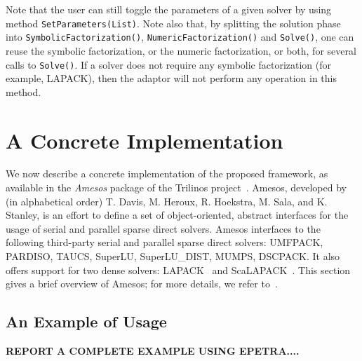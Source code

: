\documentclass[acmtocl]{acmtrans2m}
\begin{document}
Note that the user can still toggle the parameters of a given solver by using
method \verb!SetParameters(List)!. Note also that, by splitting the solution phase
into \verb!SymbolicFactorization()!, \verb!NumericFactorization()! and
\verb!Solve()!, one can reuse the symbolic factorization, or the numeric
factorization, or both, for several calls to \verb!Solve()!. If a solver does
not require any symbolic factorization (for example, LAPACK), then the adaptor
will not perform any operation in this method.

\section{A Concrete Implementation}
\label{sec:concrete}

We now describe a concrete implementation of the proposed framework, as
available in the {\sl Amesos} package of the Trilinos
project~\cite{heroux05trilinos,trilinos-home-page}.
Amesos, developed by (in alphabetical order) T. Davis,
M. Heroux, R. Hoekstra, M. Sala, and K. Stanley, is an effort to define a set
of object-oriented, abstract interfaces for the usage of serial and
parallel sparse direct solvers. 
Amesos interfaces to the following third-party serial and parallel sparse
direct solvers: UMFPACK, PARDISO, TAUCS, SuperLU, SuperLU\_DIST, MUMPS,
DSCPACK. It also offers support for two dense solvers:
LAPACK~\cite{lapack-guide} and
ScaLAPACK~\cite{scalapack-guide}.
This section gives a brief overview of Amesos; for more details, we
refer to~\cite{Amesos-Reference-Guide}.



\subsection{An Example of Usage}
\label{sec:basic}

{\bf REPORT A COMPLETE EXAMPLE USING EPETRA....}
\end{document}
